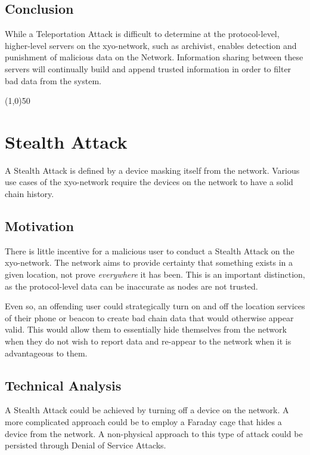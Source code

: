 \documentclass{article}
\begin{document}
\subsection{Conclusion}
While a Teleportation Attack is difficult to determine at the protocol-level, higher-level servers on the \Gls{xyo-network}, such as \Gls{archivist}, enables detection and punishment of malicious data on the Network. Information sharing between these servers will continually build and append trusted information in order to filter bad data from the system.

\begin{center}
\line(1,0){50}
\end{center}

\section{Stealth Attack}
A Stealth Attack is defined by a device masking itself from the network. Various use cases of the \Gls{xyo-network} require the devices on the network to have a solid chain history. 

\subsection{Motivation}
There is little incentive for a malicious user to conduct a Stealth Attack on the \Gls{xyo-network}. The network aims to provide certainty that something exists in a given location, not prove \textit{everywhere} it has been. This is an important distinction, as the protocol-level data can be inaccurate as nodes are not trusted.

Even so, an offending user could strategically turn on and off the location services of their phone or beacon to create bad chain data that would otherwise appear valid. This would allow them to essentially hide themselves from the network when they do not wish to report data and re-appear to the network when it is advantageous to them.

\subsection{Technical Analysis}
A Stealth Attack could be achieved by turning off a device on the network. A more complicated approach could be to employ a Faraday cage that hides a device from the network. A non-physical approach to this type of attack could be persisted through Denial of Service Attacks. 
\end{document}
